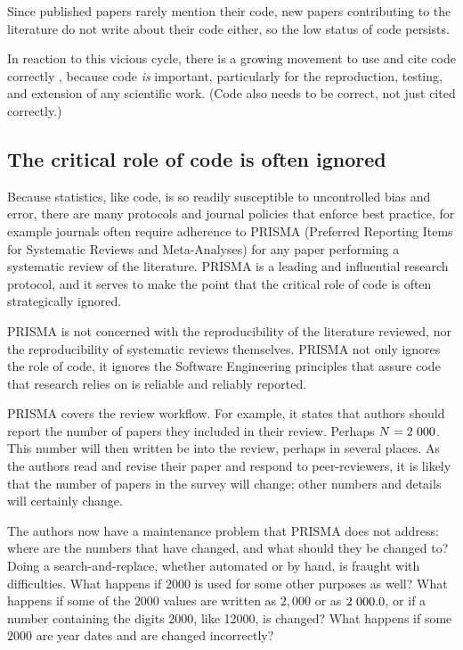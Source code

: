 \documentclass{comjnl}
\def\supplement{Supplemental Material}
\begin{document}
Since published papers rarely mention their code, new papers contributing to the literature do not write about their code either, so the low status of code persists. 

In reaction to this vicious cycle, there is a growing movement to use and cite code correctly \cite{cite-code,TOP}, because code \emph{is\/} important, particularly for the reproduction, testing, and extension of any scientific work. (Code also needs to be correct, not just cited correctly.)


\subsection{The critical role of code is often ignored}\label{central-role-of-code}\label{PRISMA-statement}
Because statistics, like code, is so readily susceptible to uncontrolled bias and error, there are many protocols and journal policies that enforce best practice, for example journals often require adherence to PRISMA (Preferred Reporting Items for Systematic Reviews and Meta-Analyses) \cite{prisma} for any paper performing a systematic review of the literature. PRISMA is a leading and influential research protocol, and it serves to make the point that the critical role of code is often strategically ignored. 

PRISMA is not concerned with the reproducibility of the literature reviewed, nor the reproducibility of systematic reviews themselves. PRISMA not only ignores the role of code, it ignores the Software Engineering principles that assure code that research relies on is reliable and reliably reported. 

PRISMA covers the review workflow. For example, it states that authors should report the number of papers they included in their review. Perhaps $N=2\hskip 0.3em 000$. This number will then written be into the review, perhaps in several places. As the authors read and revise their paper and respond to peer-reviewers, it is likely that the number of papers in the survey will change; other numbers and details will certainly change. 

The authors now have a maintenance problem that PRISMA does not address: where are the numbers that have changed, and what should they be changed to? Doing a search-and-replace, whether automated or by hand, is fraught with difficulties. What happens if $2000$ is used for some other purposes as well? What happens if some of the $2000$ values are written as $2,000$ or as $2\hskip 0.3em 000.0$, or if a number containing the digits 2000, like 12000, is changed? What happens if some $2000$ are year dates and are changed incorrectly? 
\end{document}
